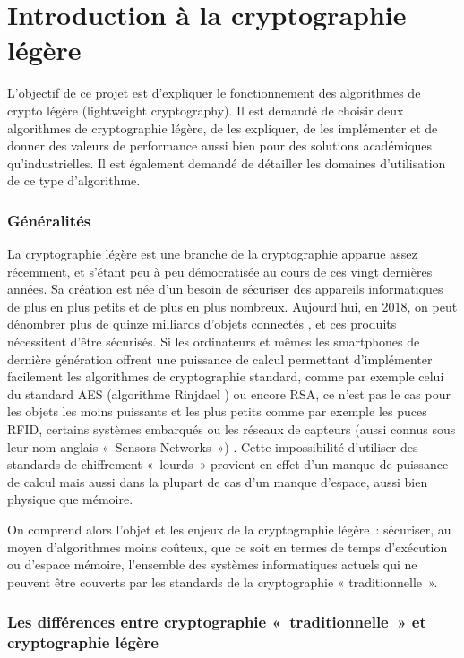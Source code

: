 \newpage
\part{Introduction à la cryptographie légère}

		L'objectif de ce projet est d'expliquer le fonctionnement des algorithmes de crypto légère (lightweight cryptography).
	Il est demandé de choisir deux algorithmes de cryptographie légère, de les expliquer,
	de les implémenter et de donner des valeurs de performance aussi bien pour des solutions académiques qu'industrielles.
	Il est également demandé de détailler les domaines d'utilisation de ce type d'algorithme.

	\section{Généralités}

			La cryptographie légère est une branche de la cryptographie apparue assez
		récemment, et s'étant peu à peu démocratisée au cours de ces vingt
		dernières années. Sa création est née d'un besoin de sécuriser des
		appareils informatiques de plus en plus petits et de plus en plus
		nombreux. Aujourd'hui, en 2018, on peut dénombrer  plus de  quinze
		milliards d'objets connectés \cite{renaud_developpement_2017}, et ces
		produits nécessitent d'être sécurisés. Si les ordinateurs et mêmes les
		smartphones de dernière génération offrent une puissance de calcul
		permettant d'implémenter facilement les algorithmes de cryptographie
		standard, comme par exemple celui du standard AES (algorithme Rinjdael
		\cite{AES-FIPS}) ou encore RSA, ce n'est pas le cas pour les objets les
		moins puissants et les plus petits comme par exemple les puces RFID,
		certains systèmes embarqués ou les réseaux de capteurs (aussi connus sous
		leur nom anglais « Sensors Networks ») \cite{Report_light}. Cette
		impossibilité d'utiliser des standards de chiffrement « lourds » provient
		en effet d'un manque de puissance de calcul mais aussi dans la plupart de
		cas d'un manque d'espace, aussi bien physique que mémoire.

			On comprend alors l'objet et les enjeux de la cryptographie légère :
		sécuriser, au moyen d'algorithmes moins coûteux, que ce soit en termes de
		temps d'exécution ou d'espace mémoire, l'ensemble des systèmes informatiques
		actuels qui ne peuvent être couverts par les standards de la cryptographie «
		traditionnelle ».

	\section{Les différences entre cryptographie « traditionnelle » et cryptographie légère}

